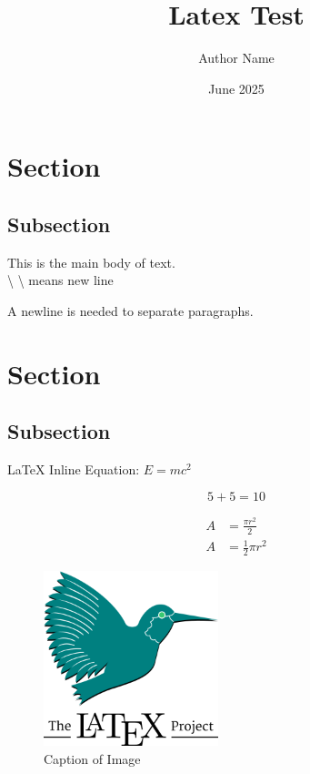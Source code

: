 \documentclass{article}
\title{Latex Test}
\author{Author Name}
\date{June 2025}
\begin{document}
\maketitle

\section{Section}

\subsection{Subsection}
This is the main body of text. \\
\textbackslash{} \textbackslash{} means new line

A newline is needed to separate paragraphs.


\newpage

\section{Section}

\subsection{Subsection}



\LaTeX{}
Inline Equation: $E=mc^2$

\begin{equation}
    5+5=10
\end{equation}

\begin{equation}
    \begin{split}
        A & = \frac{\pi r^2}{2}   \\
        A & = \frac{1}{2} \pi r^2
    \end{split}
\end{equation}

\begin{figure}[H]
    \centering
    \includegraphics[width=2in]{latex.png}
    \caption{Caption of Image}\label{fig:my_label}
\end{figure}
\end{document}
